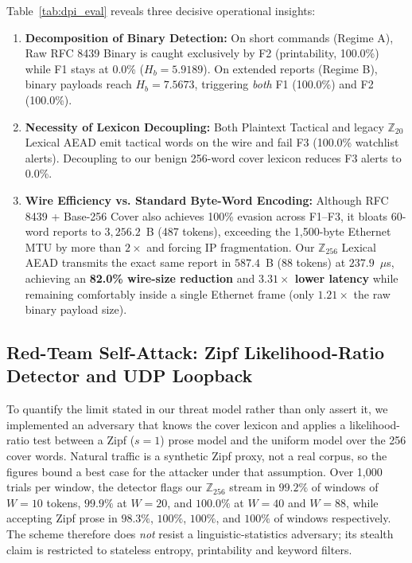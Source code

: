 \documentclass[conference]{IEEEtran}
\begin{document}
Table~\ref{tab:dpi_eval} reveals three decisive operational insights:
\begin{enumerate}
    \item \textbf{Decomposition of Binary Detection:} On short commands (Regime A), Raw RFC 8439 Binary is caught exclusively by F2 (printability, 100.0\%) while F1 stays at 0.0\% ($H_b = 5.9189$). On extended reports (Regime B), binary payloads reach $H_b = 7.5673$, triggering \emph{both} F1 (100.0\%) and F2 (100.0\%).
    \item \textbf{Necessity of Lexicon Decoupling:} Both Plaintext Tactical and legacy $\mathbb{Z}_{20}$ Lexical AEAD emit tactical words on the wire and fail F3 (100.0\% watchlist alerts). Decoupling to our benign 256-word cover lexicon reduces F3 alerts to 0.0\%.
    \item \textbf{Wire Efficiency vs. Standard Byte-Word Encoding:} Although RFC 8439 + Base-256 Cover also achieves 100\% evasion across F1--F3, it bloats 60-word reports to $3,256.2$~B (487 tokens), exceeding the 1,500-byte Ethernet MTU by more than $2\times$ and forcing IP fragmentation. Our $\mathbb{Z}_{256}$ Lexical AEAD transmits the exact same report in $587.4$~B (88 tokens) at $237.9$~$\mu$s, achieving an \textbf{82.0\% wire-size reduction} and \textbf{$3.31\times$ lower latency} while remaining comfortably inside a single Ethernet frame (only $1.21\times$ the raw binary payload size).
\end{enumerate}

\subsection{Red-Team Self-Attack: Zipf Likelihood-Ratio Detector and UDP Loopback}
\label{sec:redteam}
To quantify the limit stated in our threat model rather than only assert it, we implemented an adversary that knows the cover lexicon and applies a likelihood-ratio test between a Zipf ($s=1$) prose model and the uniform model over the 256 cover words. Natural traffic is a synthetic Zipf proxy, not a real corpus, so the figures bound a best case for the attacker under that assumption. Over 1,000 trials per window, the detector flags our $\mathbb{Z}_{256}$ stream in $99.2\%$ of windows of $W=10$ tokens, $99.9\%$ at $W=20$, and $100.0\%$ at $W=40$ and $W=88$, while accepting Zipf prose in $98.3\%$, $100\%$, $100\%$, and $100\%$ of windows respectively. The scheme therefore does \emph{not} resist a linguistic-statistics adversary; its stealth claim is restricted to stateless entropy, printability and keyword filters.
\end{document}
